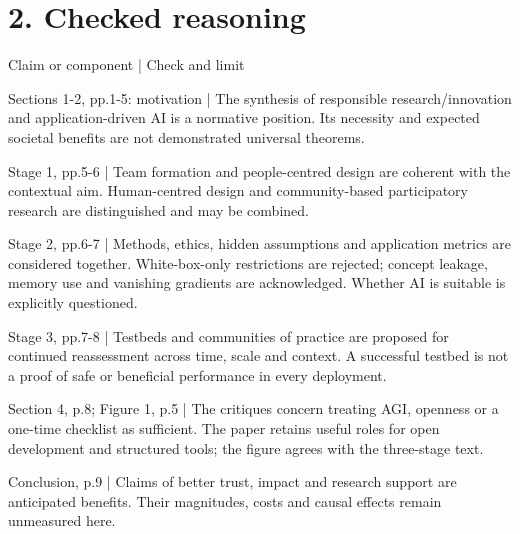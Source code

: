 \documentclass[10pt]{article}
\begin{document}
\section*{2. Checked reasoning}
Claim or component | Check and limit\par
Sections 1-2, pp.1-5: motivation | The synthesis of responsible research/innovation and application-driven AI is a normative position. Its necessity and expected societal benefits are not demonstrated universal theorems.\par
Stage 1, pp.5-6 | Team formation and people-centred design are coherent with the contextual aim. Human-centred design and community-based participatory research are distinguished and may be combined.\par
Stage 2, pp.6-7 | Methods, ethics, hidden assumptions and application metrics are considered together. White-box-only restrictions are rejected; concept leakage, memory use and vanishing gradients are acknowledged. Whether AI is suitable is explicitly questioned.\par
Stage 3, pp.7-8 | Testbeds and communities of practice are proposed for continued reassessment across time, scale and context. A successful testbed is not a proof of safe or beneficial performance in every deployment.\par
Section 4, p.8; Figure 1, p.5 | The critiques concern treating AGI, openness or a one-time checklist as sufficient. The paper retains useful roles for open development and structured tools; the figure agrees with the three-stage text.\par
Conclusion, p.9 | Claims of better trust, impact and research support are anticipated benefits. Their magnitudes, costs and causal effects remain unmeasured here.\par
\end{document}
